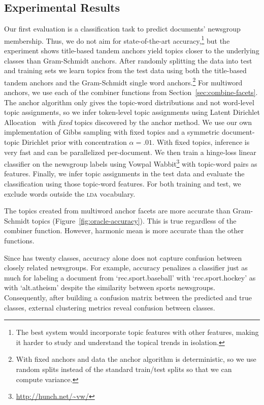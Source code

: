 \subsection{Experimental Results}

Our first evaluation is a classification task to predict
documents' newsgroup membership.
Thus, we do not aim for state-of-the-art accuracy,\footnote{The best system would incorporate topic features with other features,
making it harder to study and understand the topical trends in isolation.}
but the experiment shows title-based tandem anchors yield topics
closer to the underlying classes than Gram-Schmidt anchors.
After randomly splitting the data into test and training sets we learn topics
from the test data using both the title-based tandem anchors and the
Gram-Schmidt single word anchors.\footnote{With fixed anchors and data the anchor algorithm is deterministic, so
we use random splits instead of the standard train/test splits so that we can
compute variance.}
For multiword anchors, we use each of the combiner functions from
Section~\ref{sec:combine-facets}.
The anchor algorithm only gives the topic-word distributions and not
word-level topic assignments, so we infer token-level topic assignments using
Latent Dirichlet Allocation~\cite{lda} with \emph{fixed} topics discovered by
the anchor method.
We use our own implementation of Gibbs sampling with fixed topics and a
symmetric document-topic Dirichlet prior with concentration
$\alpha=.01$.
With fixed topics, inference is very fast and can be
parallelized per-document.
We then train a hinge-loss linear classifier on the newsgroup labels using
Vowpal Wabbit\footnote{\url{http://hunch.net/~vw/}} with topic-word pairs as
features.
Finally, we infer topic assignments in the test data and evaluate the
classification using those topic-word features.
For both training and test, we exclude words outside the \textsc{lda} vocabulary.

The topics created from multiword anchor facets are more accurate than
Gram-Schmidt topics (Figure~\ref{fig:oracle-accuracy}).
This is true regardless of the combiner function.
However, harmonic mean is more accurate than the other functions.\statsigoracle{}

Since \twentynews{} has twenty classes, accuracy alone does not capture
confusion between closely related newsgroups.
For example, accuracy penalizes a classifier just as much for labeling a
document from `rec.sport.baseball' with `rec.sport.hockey' as with
`alt.atheism' despite the similarity between sports newsgroups.
Consequently, after building a confusion matrix between the predicted and true
classes, external clustering metrics reveal confusion between classes.

